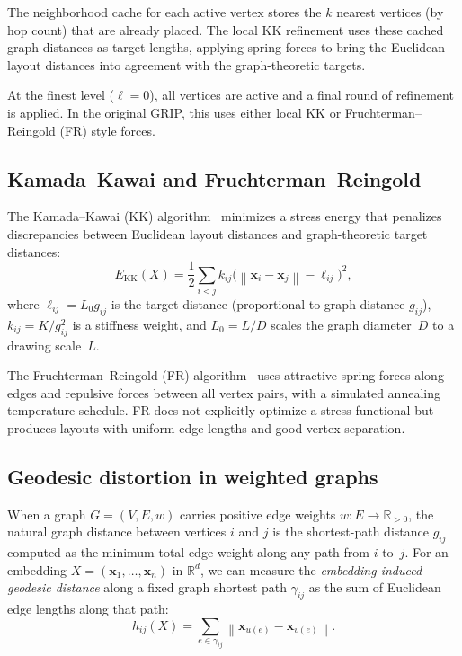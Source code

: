 \documentclass[11pt,twocolumn]{article}
\newcommand{\RR}{\mathbb{R}}
\newcommand{\norm}[1]{\left\lVert #1 \right\rVert}
\newcommand{\vect}[1]{\mathbf{#1}}
\begin{document}
The neighborhood cache for each active vertex stores the $k$ nearest
vertices (by hop count) that are already placed.  The local KK
refinement uses these cached graph distances as target lengths, applying
spring forces to bring the Euclidean layout distances into agreement with
the graph-theoretic targets.

At the finest level ($\ell = 0$), all vertices are active and a final
round of refinement is applied.  In the original GRIP, this uses either
local KK or Fruchterman--Reingold (FR) style forces.

\subsection{Kamada--Kawai and Fruchterman--Reingold}

The Kamada--Kawai (KK) algorithm~\citep{kamada1989} minimizes a stress
energy that penalizes discrepancies between Euclidean layout distances
and graph-theoretic target distances:
\begin{equation}\label{eq:kk}
  E_{\mathrm{KK}}(X)
  = \frac{1}{2}\sum_{i < j}
    k_{ij}\bigl(\norm{\vect{x}_i - \vect{x}_j} - \ell_{ij}\bigr)^2,
\end{equation}
where $\ell_{ij} = L_0 g_{ij}$ is the target distance (proportional to
graph distance $g_{ij}$), $k_{ij} = K / g_{ij}^2$ is a stiffness
weight, and $L_0 = L/D$ scales the graph diameter~$D$ to a drawing
scale~$L$.

The Fruchterman--Reingold (FR) algorithm~\citep{fruchterman1991} uses
attractive spring forces along edges and repulsive forces between all
vertex pairs, with a simulated annealing temperature schedule.  FR does
not explicitly optimize a stress functional but produces layouts with
uniform edge lengths and good vertex separation.

\subsection{Geodesic distortion in weighted graphs}

When a graph $G = (V, E, w)$ carries positive edge weights
$w : E \to \RR_{> 0}$, the natural graph distance between vertices $i$
and $j$ is the shortest-path distance $g_{ij}$ computed as the minimum
total edge weight along any path from $i$ to~$j$.  For an embedding
$X = (\vect{x}_1, \ldots, \vect{x}_n)$ in $\RR^d$, we can measure the
\emph{embedding-induced geodesic distance} along a fixed graph shortest
path $\gamma_{ij}$ as the sum of Euclidean edge lengths along that path:
\begin{equation}\label{eq:geodesic}
  h_{ij}(X) = \sum_{e \in \gamma_{ij}} \norm{\vect{x}_{u(e)} - \vect{x}_{v(e)}}.
\end{equation}
\end{document}
